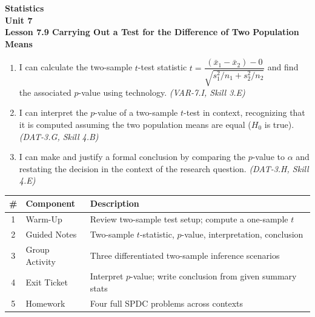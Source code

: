 \documentclass[10pt]{article}
\begin{document}
\vspace{-0.8in}

\begin{center}
  {\color{white}\textbf{\LARGE Statistics}}\\[4pt]
  {\color{skymid}\large\textbf{Unit 7}}\\[6pt]
  {\color{white}\textbf{\large Lesson 7.9 \quad Carrying Out a Test for the Difference of Two Population Means}}
\end{center}

\vspace{0.22in}
\namedateperiod
\vspace{0.18in}

\begin{learningtargetbox}
\small
\begin{enumerate}[leftmargin=1.5em, itemsep=5pt]
  \item I can calculate the two-sample $t$-test statistic
        $t = \dfrac{(\bar x_1 - \bar x_2) - 0}{\sqrt{s_1^2/n_1 + s_2^2/n_2}}$
        and find the associated $p$-value using technology.
        \textit{(VAR-7.I, Skill 3.E)}
  \item I can interpret the $p$-value of a two-sample $t$-test in context, recognizing
        that it is computed assuming the two population means are equal ($H_0$ is true).
        \textit{(DAT-3.G, Skill 4.B)}
  \item I can make and justify a formal conclusion by comparing the $p$-value to $\alpha$
        and restating the decision in the context of the research question.
        \textit{(DAT-3.H, Skill 4.E)}
\end{enumerate}
\end{learningtargetbox}

\vspace{0.14in}

\begin{tocbox}
\small
\renewcommand{\arraystretch}{1.5}
\begin{tabularx}{\linewidth}{@{} c l X @{}}
\rowcolor{sky}
\textbf{\#} & \textbf{Component} & \textbf{Description} \\
\midrule
1 & Warm-Up        & Review two-sample test setup; compute a one-sample $t$ \\
2 & Guided Notes   & Two-sample $t$-statistic, $p$-value, interpretation, conclusion \\
3 & Group Activity & Three differentiated two-sample inference scenarios \\
4 & Exit Ticket    & Interpret $p$-value; write conclusion from given summary stats \\
5 & Homework       & Four full SPDC problems across contexts \\
\end{tabularx}
\end{tocbox}
\end{document}
